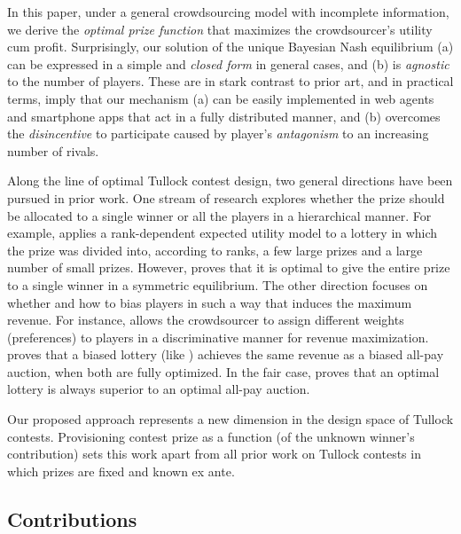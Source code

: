 \documentclass{sig-alternate-10pt}
\begin{document}
In this paper, under a general crowdsourcing model with incomplete information, we derive the {\em optimal prize function} that maximizes the crowdsourcer's utility cum profit. Surprisingly, our solution of the unique Bayesian Nash equilibrium (a) can be expressed in a simple and {\em closed form} in general cases, and (b) is {\em agnostic} to the number of players. These are in stark contrast to prior art, and in practical terms, imply that our mechanism (a) can be easily implemented in web agents and smartphone apps that act in a fully distributed manner, and (b) overcomes the {\em disincentive} to participate caused by player's {\em antagonism} to an increasing number of rivals.

Along the line of optimal Tullock contest design, two general directions have been pursued in prior work. One stream of research explores whether the prize should be allocated to a single winner or all the players in a hierarchical manner. For example, \cite{optlot91} applies a rank-dependent expected utility model to a lottery in which the prize was divided into, according to ranks, a few large prizes and a large number of small prizes. However, \cite{optSymTullock12} proves that it is optimal to give the entire prize to a single winner in a symmetric equilibrium. The other direction focuses on whether and how to bias players in such a way that induces the maximum revenue. For instance, \cite{Franke14} allows the crowdsourcer to assign different weights (preferences) to players in a discriminative manner for revenue maximization. \cite{lottery13apa} proves that a biased lottery (like \cite{Franke14}) achieves the same revenue as a biased all-pay auction, when both are fully optimized. In the fair case, \cite{lottery13apa} proves that an optimal lottery is always superior to an optimal all-pay auction.

Our proposed approach represents a new dimension in the design space of Tullock contests. Provisioning contest prize as a function (of the unknown winner's contribution) sets this work apart from all prior work on Tullock contests in which prizes are fixed and known ex ante.









\subsection{Contributions}
\end{document}
